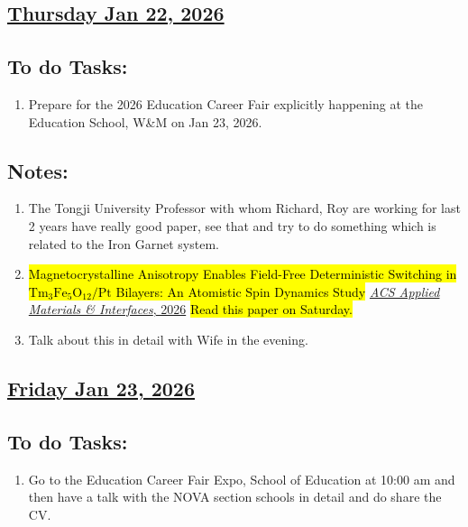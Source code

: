 \subsection*{\underline{Thursday Jan 22, 2026}}
\subsection*{To do Tasks:}
\begin{enumerate}
    \item Prepare for the 2026 Education Career Fair explicitly happening at the Education School, W\&M on Jan 23, 2026.    
\end{enumerate}
\subsection*{Notes:}
\begin{enumerate}
    \item The Tongji University Professor with whom Richard, Roy are working for last 2 years have really good paper, see that and try to do something which is related to the Iron Garnet system.
    \item \hl{Magnetocrystalline Anisotropy Enables Field-Free Deterministic Switching in $\mathrm{Tm_3Fe_5O_{12}/Pt}$ Bilayers: An Atomistic Spin Dynamics Study} \href{https://doi.org/10.1021/acsami.5c23180}{\textit{ACS Applied Materials \& Interfaces}, 2026} \hl{Read this paper on Saturday.}
    \item Talk about this in detail with Wife in the evening.
\end{enumerate}
\subsection*{\underline{Friday Jan 23, 2026}}
\subsection*{To do Tasks:}
\begin{enumerate}
    \item Go to the Education Career Fair Expo, School of Education at 10:00 am and then have a talk with the NOVA section schools in detail and do share the CV.
\end{enumerate}
